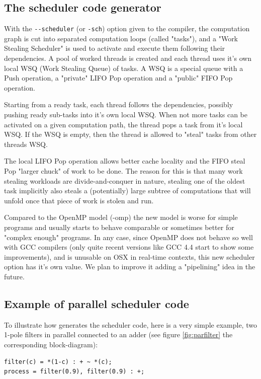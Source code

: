 \documentclass[a4paper,10pt]{book}
\begin{document}
\subsection{The scheduler code generator}
 With the \lstinline!--scheduler! (or \lstinline!-sch!) option given to the \faust compiler, the computation graph is cut into separated computation loops (called "tasks"), and a "Work Stealing Scheduler" is used to activate and execute them following their dependencies. A pool of worked threads is created and each thread uses it's own local WSQ (Work Stealing Queue) of tasks. A WSQ is a special queue with a Push operation, a "private" LIFO Pop operation and a "public" FIFO Pop operation.

Starting from a ready task, each thread follows the dependencies, possibly pushing ready sub-tasks into it's own local WSQ. When not more tasks can be activated on a given computation path, the thread pops a task from it's local WSQ. If the WSQ is empty, then the thread is allowed to "steal" tasks from other threads WSQ.

The local LIFO Pop operation allows better cache locality and the FIFO steal Pop "larger chuck" of work to be done. The reason for this is that many work stealing workloads are divide-and-conquer in nature, stealing one of the oldest task implicitly also steals a (potentially) large subtree of computations that will unfold once that piece of work is stolen and run.

Compared to the OpenMP model (-omp) the new model is worse for simple \faust  programs and usually starts to behave comparable or sometimes better for "complex enough" \faust  programs. In any case, since OpenMP does not behave so well with GCC compilers (only quite recent versions like GCC 4.4 start to show some improvements), and is unusable on OSX in real-time contexts, this new scheduler option has it's own value.  We plan to improve it adding a "pipelining" idea in the future.

\subsection{Example of parallel scheduler code}
To illustrate how \faust generates the scheduler code, here is a very simple example, two 1-pole filters in parallel connected to an adder (see figure \ref{fig:parfilter} the corresponding block-diagram):

\begin{lstlisting}
filter(c) = *(1-c) : + ~ *(c);
process = filter(0.9), filter(0.9) : +; 
\end{lstlisting}
\end{document}
